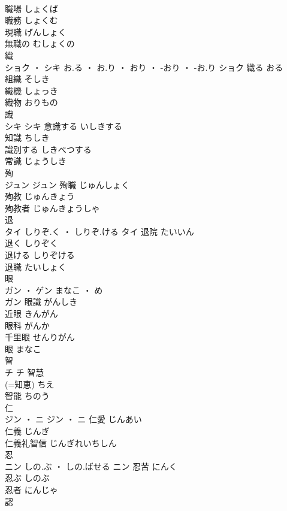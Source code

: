 \documentclass[8pt]{extreport}
\begin{document}
\begin{CJK}{UTF8}{min}
\\	職場	しょくば	
\\	職務	しょくむ	
\\	現職	げんしょく	
\\	無職の	むしょくの	
\\	織	
\\	ショク ・ シキ	お.る ・ お.り ・ おり ・ -おり ・ -お.り	ショク	織る	おる	
\\	組織	そしき	
\\	織機	しょっき	
\\	織物	おりもの	
\\	識	
\\	シキ		シキ	意識する	いしきする	
\\	知識	ちしき	
\\	識別する	しきべつする	
\\	常識	じょうしき	
\\	殉	
\\	ジュン		ジュン	殉職	じゅんしょく	
\\	殉教	じゅんきょう	
\\	殉教者	じゅんきょうしゃ	
\\	退	
\\	タイ	しりぞ.く ・ しりぞ.ける	タイ	退院	たいいん	
\\	退く	しりぞく	
\\	退ける	しりぞける	
\\	退職	たいしょく	
\\	眼	
\\	ガン ・ ゲン	まなこ ・ め
\\	ガン	眼識	がんしき	
\\	近眼	きんがん	
\\	眼科	がんか	
\\	千里眼	せんりがん	
\\	眼	まなこ	
\\	智	
\\	チ		チ	智慧
\\	(=知恵)	ちえ	
\\	智能	ちのう	
\\	仁	
\\	ジン ・ ニ		ジン ・ ニ	仁愛	じんあい	
\\	仁義	じんぎ	
\\	仁義礼智信	じんぎれいちしん	
\\	忍	
\\	ニン	しの.ぶ ・ しの.ばせる	ニン	忍苦	にんく	
\\	忍ぶ	しのぶ	
\\	忍者	にんじゃ	
\\	認	

\end{CJK}
\end{document}
